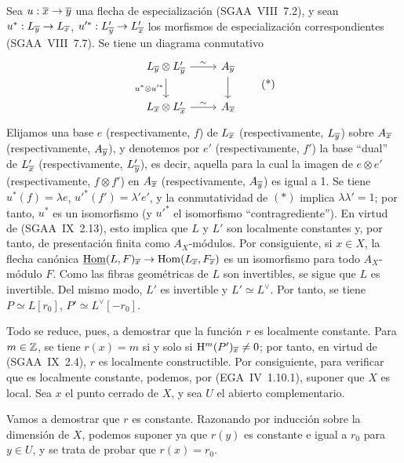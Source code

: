 Sea $u : \overline{x} \to \overline{y}$ una flecha de especialización (SGAA~VIII~7.2), y sean $u^{*} : L_{\overline{y}} \to L_{\overline{x}}$, $u'^{*} : L'_{\overline{y}} \to L'_{\overline{x}}$ los morfismos de especialización correspondientes (SGAA~VIII~7.7). Se tiene un diagrama conmutativo
\begin{equation}
\begin{tikzcd}
L_{\ol{y}} \otimes L'_{\ol{y}} \arrow[r,"\sim"] \arrow[d,"u^{*} \otimes u'^{*}"'] & A_{\ol{y}} \arrow[d] \\
L_{\ol{x}} \otimes L'_{\ol{x}} \arrow[r,"\sim"] & A_{\ol{x}}
\end{tikzcd}
\tag{*}
\end{equation}
Elijamos una base $e$ (respectivamente, $f$) de $L_{\overline{x}}$ (respectivamente, $L_{\overline{y}}$) sobre $A_{\overline{x}}$ (respectivamente, $A_{\overline{y}}$), y denotemos por $e'$ (respectivamente, $f'$) la base ``dual'' de $L'_{\overline{x}}$ (respectivamente, $L'_{\overline{y}}$), es decir, aquella para la cual la imagen de $e \otimes e'$ (respectivamente, $f \otimes f'$) en $A_{\overline{x}}$ (respectivamente, $A_{\overline{y}}$) es igual a 1. Se tiene $u^{*}(f) = \lambda e$, $u'^{*}(f') = \lambda' e'$, y la conmutatividad de $(*)$ implica $\lambda\lambda' = 1$; por tanto, $u^{*}$ es un isomorfismo (y $u'^{*}$ el isomorfismo ``contragrediente''). En virtud de (SGAA~IX~2.13), esto implica que $L$ y $L'$ son localmente constantes y, por tanto, de presentación finita como $A_X$-módulos. Por consiguiente, si $x \in X$, la flecha canónica $\underline{\operatorname{Hom}}(L,F)_{\overline{x}} \to \operatorname{Hom}(L_{\overline{x}}, F_{\overline{x}})$ es un isomorfismo para todo $A_X$-módulo $F$. Como las fibras geométricas de $L$ son invertibles, se sigue que $L$ es invertible. Del mismo modo, $L'$ es invertible y $L' \simeq L^{\vee}$. Por tanto, se tiene $P \simeq L[r_0]$, $P' \simeq L^{\vee}[-r_0]$.

Todo se reduce, pues, a demostrar que la función $r$ es localmente constante. Para $m \in \mathbb{Z}$, se tiene $r(x) = m$ si y solo si $\mathrm{H}^{m}(P')_{\overline{x}} \neq 0$; por tanto, en virtud de (SGAA~IX~2.4), $r$ es localmente constructible. Por consiguiente, para verificar que es localmente constante, podemos, por (EGA~IV~1.10.1), suponer que $X$ es local. Sea $x$ el punto cerrado de $X$, y sea $U$ el abierto complementario.

Vamos a demostrar que $r$ es constante. Razonando por inducción sobre la dimensión de $X$, podemos suponer ya que $r(y)$ es constante e igual a $r_0$ para $y \in U$, y se trata de probar que $r(x) = r_0$.

